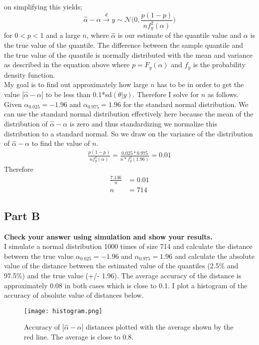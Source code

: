 \documentclass{article}
\begin{document}
on simplifying this yields;
$$\hat{\alpha} - \alpha \xrightarrow{d} y \sim \mathcal{N} \Bigg(0, \frac{p (1 - p)}{nf_y^2(\alpha)} \Bigg)$$
for $0 < p < 1$ and a large $n$, where $\hat{\alpha}$ is our estimate of the quantile value and $\alpha$ is the true value of the quantile. The difference between the sample quantile and the true value of the quantile is normally distributed with the mean and variance as described in the equation above where $p = F_y(\alpha)$ and $f_y$ is the probability density function.\\
My goal is to find out approximately how large $n$ has to be in order to get the value $|\hat{\alpha} - \alpha|$ to be less than 0.1*sd$(\theta|y)$.
Therefore I solve for $n$ as follows.\\
Given $\alpha_{0.025} = -1.96$ and $\alpha_{0.975} = 1.96$ for the standard normal distribution. We can use the standard normal distribution effectively here because the mean of the distribution of $\hat{\alpha} - \alpha$ is zero and thus standardizing we normalize this distribution to a standard normal. So we draw on the variance of the distribution of $\hat{\alpha} - \alpha$ to find the value of $n$.
\begin{align*}
\frac{p (1 - p)}{nf_y^2(\alpha)} = \frac{0.025*0.975}{n * f_y^2(1.96)} = 0.01
\end{align*}
Therefore
\begin{align*}
\frac{7.136}{n} &= 0.01\\
n &= 714
\end{align*}

\subsection{Part B}
\textbf{Check your answer using simulation and show your results.}\\
I simulate a normal distribution 1000 times of size 714 and calculate the distance between the true value $\alpha_{0.025} = -1.96$ and  $\alpha_{0.975} = 1.96$ and calculate the absolute value of the distance between the estimated value of the quantiles (2.5\% and 97.5\%) and the true value (+/- 1.96). The average accuracy of the distance is approximately 0.08 in both cases which is close to 0.1. I plot a histogram of the accuracy of absolute value of distances below.
 \begin{figure}[H]
\centering
\texttt{[image: histogram.png]}
\caption{Accuracy of $|\hat{\alpha} - \alpha|$ distances plotted with the average shown by the red line. The average is close to 0.8.}
\label{deltat}
\end{figure}
\end{document}
